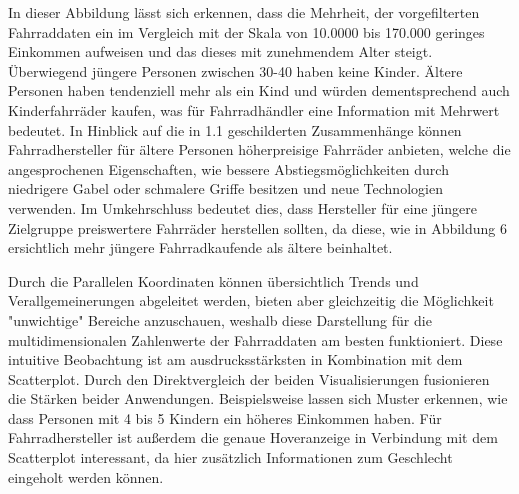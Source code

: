 \documentclass[usegeometry=true]{scrartcl}
\begin{document}
\newline In dieser Abbildung lässt sich erkennen, dass die Mehrheit, der vorgefilterten Fahrraddaten ein im Vergleich mit der Skala von 10.0000 bis 170.000 geringes Einkommen aufweisen und das dieses mit zunehmendem Alter steigt. Überwiegend jüngere Personen zwischen 30-40 haben keine Kinder. Ältere Personen haben tendenziell mehr als ein Kind und würden dementsprechend auch Kinderfahrräder kaufen, was für Fahrradhändler eine Information mit Mehrwert bedeutet. In Hinblick auf die in 1.1 geschilderten Zusammenhänge können Fahrradhersteller  für ältere Personen höherpreisige Fahrräder anbieten, welche die angesprochenen Eigenschaften, wie bessere Abstiegsmöglichkeiten durch niedrigere Gabel oder schmalere Griffe besitzen und neue Technologien verwenden.  Im Umkehrschluss bedeutet dies, dass Hersteller für eine jüngere Zielgruppe preiswertere Fahrräder herstellen sollten, da diese, wie in Abbildung 6 ersichtlich mehr jüngere Fahrradkaufende als ältere beinhaltet.  

Durch die Parallelen Koordinaten können übersichtlich Trends und Verallgemeinerungen abgeleitet werden, bieten aber gleichzeitig die Möglichkeit "unwichtige" Bereiche anzuschauen, weshalb diese Darstellung für die multidimensionalen Zahlenwerte der Fahrraddaten am besten funktioniert. Diese intuitive Beobachtung ist am ausdrucksstärksten in Kombination mit dem Scatterplot. Durch den Direktvergleich der beiden Visualisierungen fusionieren die Stärken beider Anwendungen. Beispielsweise lassen sich Muster erkennen, wie dass Personen mit 4 bis 5 Kindern ein höheres Einkommen haben. Für Fahrradhersteller ist außerdem die genaue Hoveranzeige in Verbindung mit dem Scatterplot interessant, da hier zusätzlich Informationen zum Geschlecht eingeholt werden können.
\end{document}
